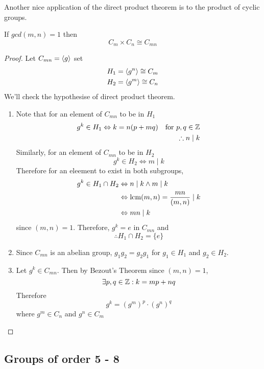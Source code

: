 \documentclass{article}
\begin{document}
Another nice application of the direct product theorem is to the product of cyclic groups.
\begin{thm}
    If $gcd(m, n) = 1$ then
    \[
        C_m \times C_n \cong C_{mn}
    \]
\end{thm}
\begin{proof}
    Let $C_{mn} = \left\langle g\right\rangle$ set
    \begin{align*}
        H_1 = \left\langle g^n\right\rangle \cong C_m \\
        H_2 = \left\langle g^m\right\rangle \cong C_n
    \end{align*}
    We'll check the hypothesise of direct product theorem.
    \begin{enumerate}
        \item Note that for an element of $C_{mn}$ to be in $H_1$
        \begin{align*}
            g^k \in H_1 \Leftrightarrow k = n(p + mq) \quad \text{for} \ p, q \in \Z \\
            \therefore n \mid k
        \end{align*}
        Similarly, for an element of $C_{mn}$ to be in $H_2$
        \[
            g^k \in H_2 \Leftrightarrow m \mid k
        \]
        Therefore for an eleement to exist in both subgroups,
        \begin{align*}
            g^k \in H_1 \cap H_2 &\Leftrightarrow n \mid k \wedge m \mid k \\
            &\Leftrightarrow \operatorname{lcm}(m, n) = \frac{mn}{(m,n)} \mid k \\
            &\Leftrightarrow mn \mid k
        \end{align*}
        since $(m, n) = 1$. Therefore, $g^k = e$ in $C_{mn}$ and
        \[
            \therefore H_1 \cap H_2 = \{ e \}  
        \]

        \item Since $C_{mn}$ is an abelian group, $g_1 g_2 = g_2 g_1$ for $g_1 \in H_1$ and $g_2 \in H_2$.
        \item Let $g^k \in C_{mn}$. Then by Bezout's Theorem since $(m, n) = 1$, 
        \[
            \exists p, q \in \mathbb{Z} : k = mp + nq
        \]
        Therefore
        \[
            g^k = (g^m)^p \cdot (g^n)^q  
        \]
        where $g^m \in C_n$ and $g^n \in C_m$
    \end{enumerate}
\end{proof}
\subsection{Groups of order 5 - 8}
\end{document}
